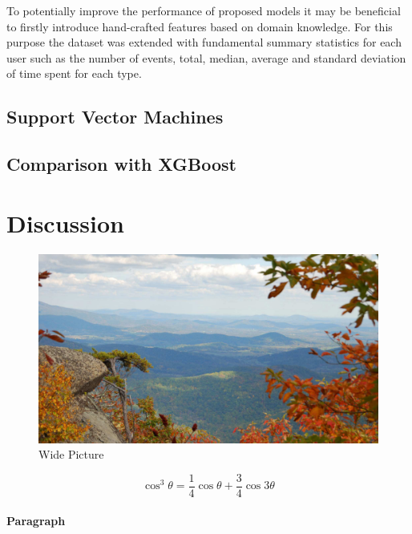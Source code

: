 \documentclass[fleqn,10pt]{SelfArx} %
\begin{document}
To potentially improve the performance of proposed models it may be beneficial to firstly introduce hand-crafted features based on domain knowledge.
For this purpose the dataset was extended with fundamental summary statistics for each user such as the number of events, total, median, average and standard deviation of time spent for each type.

\subsection{Support Vector Machines}

\subsection{Comparison with XGBoost}


\section{Discussion}

\begin{figure}[ht]\centering %
\includegraphics[width=\linewidth]{images/view}
\caption{Wide Picture}
\label{fig:view}
\end{figure}

\lipsum[4] %

\begin{equation}
\cos^3 \theta =\frac{1}{4}\cos\theta+\frac{3}{4}\cos 3\theta
\label{eq:refname2}
\end{equation}

\paragraph{Paragraph} \lipsum[7] %
\end{document}
